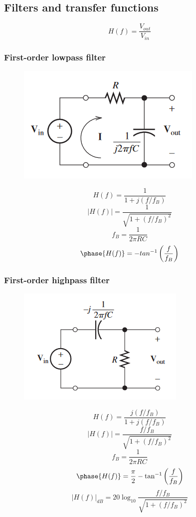 \documentclass{article}
\begin{document}
\subsection{Filters and transfer functions}
\[ H(f) = \frac{V_{out}}{V_{in}} \]

\subsubsection{First-order lowpass filter}
\begin{figure}[H]
    \centering
        \includegraphics[scale=1]{1st-order-lowpass.png}
    \label{fig:1stlowpass}
\end{figure}
\[ H(f) = \frac{1}{1 + j(f/f_B)} \]
\[ |H(f)| = \frac{1}{\sqrt{1 + (f/f_B)^2}} \]
\[ f_B = \frac{1}{2\pi RC} \]
\[ \phase{H(f)} = -tan^{-1} \left( \frac{f}{f_B} \right) \]

\subsubsection{First-order highpass filter}
\begin{figure}[H]
    \centering
        \includegraphics[scale=1]{1st-order-highpass.png}
    \label{fig:1sthighpass}
\end{figure}
\[ H(f) = \frac{j(f/f_B)}{1 + j(f/f_B)} \]
\[ |H(f)| = \frac{f/f_B}{\sqrt{1+(f/f_B)^2}} \]
\[ f_B = \frac{1}{2\pi RC} \]
\[ \phase{H(f)} = \frac{\pi}{2} - \tan^{-1} \left( \frac{f}{f_B} \right) \]
\[ |H(f)|_{dB} = 20\log_{10} \frac{f/f_B}{\sqrt{1 + (f/f_B)^2}} \]
\end{document}
